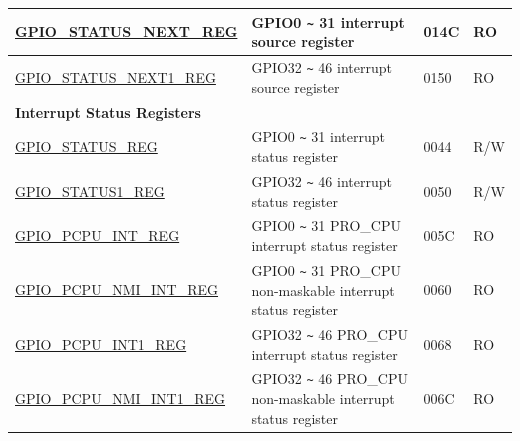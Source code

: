 \begin{longtable}{ | p{6cm} | p{7.2cm} | p{1.3cm} | p{1cm} | }
\hyperref[regdesc:GPIOSTATUSNEXTREG]{GPIO\_STATUS\_NEXT\_REG} & GPIO0 \verb+~+ 31 interrupt source register & \hexprefix{}014C & RO \\ \hline
\hyperref[regdesc:GPIOSTATUSNEXT1REG]{GPIO\_STATUS\_NEXT1\_REG} & GPIO32 \verb+~+ 46 interrupt source register & \hexprefix{}0150 & RO \\ \hline
\multicolumn{4}{|l|}{\textbf{Interrupt Status Registers}} \\ \hline
\hyperref[regdesc:GPIOSTATUSREG]{GPIO\_STATUS\_REG} & GPIO0 \verb+~+ 31 interrupt status register & \hexprefix{}0044 & R/W \\ \hline
\hyperref[regdesc:GPIOSTATUS1REG]{GPIO\_STATUS1\_REG} & GPIO32 \verb+~+ 46 interrupt status register & \hexprefix{}0050 & R/W \\ \hline
\hyperref[regdesc:GPIOPCPUINTREG]{GPIO\_PCPU\_INT\_REG} & GPIO0 \verb+~+ 31 PRO\_CPU interrupt status register & \hexprefix{}005C & RO \\ \hline
\hyperref[regdesc:GPIOPCPUNMIINTREG]{GPIO\_PCPU\_NMI\_INT\_REG} & GPIO0 \verb+~+ 31 PRO\_CPU non-maskable interrupt status register & \hexprefix{}0060 & RO \\ \hline
\hyperref[regdesc:GPIOPCPUINT1REG]{GPIO\_PCPU\_INT1\_REG} & GPIO32 \verb+~+ 46 PRO\_CPU interrupt status register & \hexprefix{}0068 & RO \\ \hline
\hyperref[regdesc:GPIOPCPUNMIINT1REG]{GPIO\_PCPU\_NMI\_INT1\_REG} & GPIO32 \verb+~+ 46 PRO\_CPU non-maskable interrupt status register & \hexprefix{}006C & RO \\ \hline
\end{longtable}
